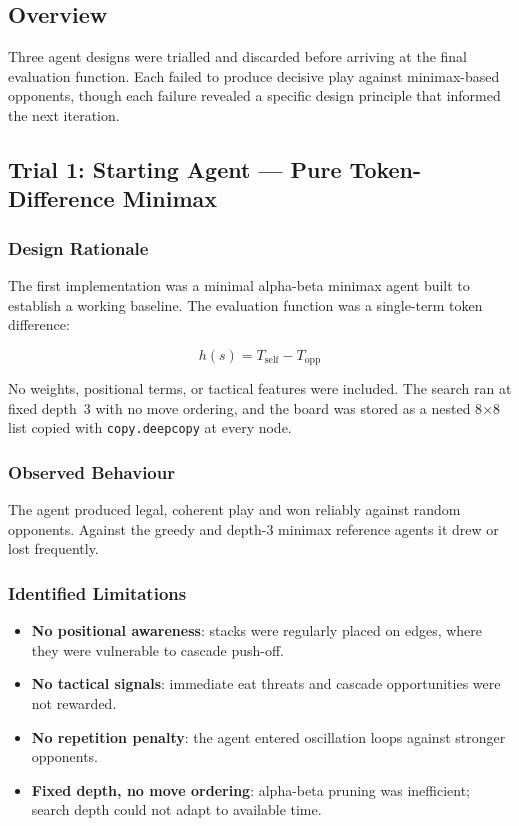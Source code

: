 \documentclass[10pt,a4paper]{article}
\begin{document}
\subsection{Overview}

Three agent designs were trialled and discarded before arriving at the final evaluation function. Each failed to produce decisive play against minimax-based opponents, though each failure revealed a specific design principle that informed the next iteration.

\subsection{Trial 1: Starting Agent --- Pure Token-Difference Minimax}

\subsubsection{Design Rationale}

The first implementation was a minimal alpha-beta minimax agent built to establish a working baseline. The evaluation function was a single-term token difference:

\begin{equation}
h(s) = T_{\text{self}} - T_{\text{opp}}
\end{equation}

No weights, positional terms, or tactical features were included. The search ran at fixed depth~3 with no move ordering, and the board was stored as a nested 8$\times$8 list copied with \texttt{copy.deepcopy} at every node.

\subsubsection{Observed Behaviour}

The agent produced legal, coherent play and won reliably against random opponents. Against the greedy and depth-3 minimax reference agents it drew or lost frequently.

\subsubsection{Identified Limitations}

\begin{itemize}[noitemsep]
    \item \textbf{No positional awareness}: stacks were regularly placed on edges, where they were vulnerable to cascade push-off.
    \item \textbf{No tactical signals}: immediate eat threats and cascade opportunities were not rewarded.
    \item \textbf{No repetition penalty}: the agent entered oscillation loops against stronger opponents.
    \item \textbf{Fixed depth, no move ordering}: alpha-beta pruning was inefficient; search depth could not adapt to available time.
\end{itemize}
\end{document}

